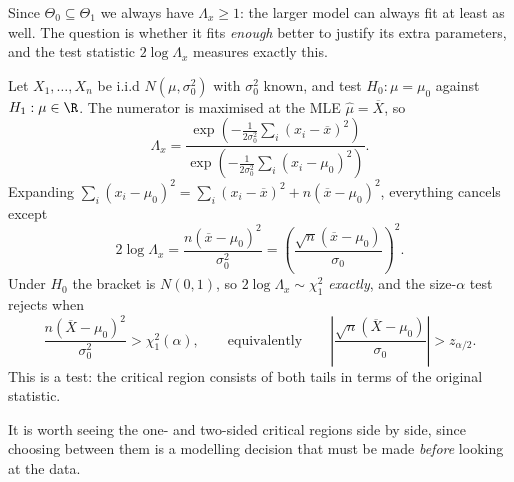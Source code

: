 Since $\Theta_0 \subseteq \Theta_1$ we always have $\Lambda_x \geq 1$: the larger model can always fit at least as well. The question is whether it fits \emph{enough} better to justify its extra parameters, and the test statistic $2\log\Lambda_x$ measures exactly this.

\begin{example}
  Let $X_1, \dots, X_n$ be i.i.d $N(\mu,\sigma_0^2)$ with $\sigma_0^2$ known, and test $H_0 : \mu = \mu_0$ against $H_1 : \mu \in \R$. The numerator is maximised at the MLE $\hat\mu = \overline{X}$, so
  $$
  \Lambda_x = \frac{\exp\left(-\frac{1}{2\sigma_0^2}\sum_i(x_i - \overline{x})^2\right)}{\exp\left(-\frac{1}{2\sigma_0^2}\sum_i(x_i-\mu_0)^2\right)}.
  $$
  Expanding $\sum_i (x_i - \mu_0)^2 = \sum_i (x_i - \overline{x})^2 + n(\overline{x}-\mu_0)^2$, everything cancels except
  $$
  2\log\Lambda_x = \frac{n\left(\overline{x}-\mu_0\right)^2}{\sigma_0^2} = \left(\frac{\sqrt{n}(\overline{x}-\mu_0)}{\sigma_0}\right)^2.
  $$
  Under $H_0$ the bracket is $N(0,1)$, so $2\log\Lambda_x \sim \chi^2_1$ \emph{exactly}, and the size-$\alpha$ test rejects when
  $$
  \frac{n(\overline{X}-\mu_0)^2}{\sigma_0^2} > \chi^2_1(\alpha), \qquad \text{equivalently} \qquad \left|\frac{\sqrt{n}(\overline{X}-\mu_0)}{\sigma_0}\right| > z_{\alpha/2}.
  $$
  This is a  test: the critical region consists of both tails in terms of the original statistic.
\end{example}

It is worth seeing the one- and two-sided critical regions side by side, since choosing between them is a modelling decision that must be made \emph{before} looking at the data.

